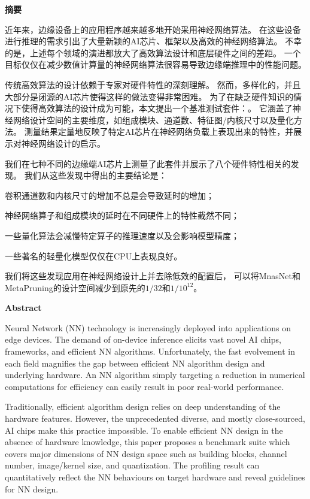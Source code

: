 \cleardoublepage{}
\begin{center}
    \bfseries {} 摘要
\end{center}
近年来，边缘设备上的应用程序越来越多地开始采用神经网络算法。
在这些设备进行推理的需求引出了大量新颖的AI芯片、框架以及高效的神经网络算法。
不幸的是，上述每个领域的演进都放大了高效算法设计和底层硬件之间的差距。
一个目标仅仅在减少数值计算量的神经网络算法很容易导致边缘端推理中的性能问题。

传统高效算法的设计依赖于专家对硬件特性的深刻理解。
然而，多样化的，并且大部分是闭源的AI芯片使得这样的做法变得非常困难。
为了在缺乏硬件知识的情况下使得高效算法的设计成为可能，本文提出一个基准测试套件：\sysname。
它涵盖了神经网络设计空间的主要维度，如组成模块、通道数、特征图/内核尺寸以及量化方法。
测量结果定量地反映了特定AI芯片在神经网络负载上表现出来的特性，并展示对神经网络设计的启示。

我们在七种不同的边缘端AI芯片上测量了此套件并展示了八个硬件特性相关的发现。
我们从这些发现中得出的主要结论是：
\begin{enumerate*}
    \item 卷积通道数和内核尺寸的增加不总是会导致延时的增加；
    \item 神经网络算子和组成模块的延时在不同硬件上的特性截然不同；
    \item 一些量化算法会减慢特定算子的推理速度以及会影响模型精度；
    \item 一些著名的轻量化模型仅仅在CPU上表现良好。
\end{enumerate*}

我们将这些发现应用在神经网络设计上并去除低效的配置后，
可以将MnasNet和MetaPruning的设计空间减少到原先的$1/32$和$1/10^{12}$。

\cleardoublepage{}
\begin{center}
    \bfseries {} Abstract
\end{center}
Neural Network (NN) technology is increasingly deployed
into applications on edge devices. The demand of on-device
inference elicits vast novel AI chips, frameworks, and efficient NN algorithms.
Unfortunately, the fast evolvement in
each field magnifies the gap between efficient NN algorithm
design and underlying hardware. An NN algorithm simply
targeting a reduction in numerical computations for efficiency
can easily result in poor real-world performance.

Traditionally, efficient algorithm design relies on deep understanding of the hardware features. 
However, the unprecedented diverse, and mostly close-sourced, AI chips make
this practice impossible. To enable efficient NN design in
the absence of hardware knowledge, this paper proposes a
benchmark suite \sysname which covers major dimensions
of NN design space such as building blocks, channel number,
image/kernel size, and quantization. The profiling result can
quantitatively reflect the NN behaviours on target
hardware and reveal guidelines for NN design.

